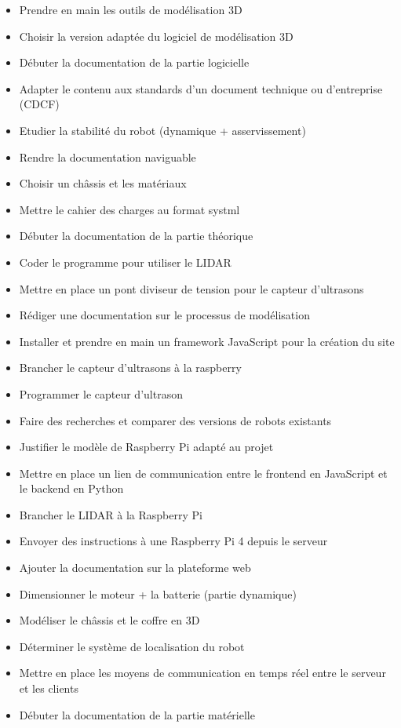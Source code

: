 \documentclass[a4paper,12pt]{report}  %
\begin{document}
\begin{itemize}
	\item Prendre en main les outils de modélisation 3D
	\item Choisir la version adaptée du logiciel de modélisation 3D
	\item Débuter la documentation de la partie logicielle
	\item Adapter le contenu aux standards d’un document technique ou d’entreprise (CDCF)
	\item Etudier la stabilité du robot (dynamique + asservissement)
	\item Rendre la documentation naviguable
	\item Choisir un châssis et les matériaux
	\item Mettre le cahier des charges au format systml
	\item Débuter la documentation de la partie théorique
	\item Coder le programme pour utiliser le LIDAR
	\item Mettre en place un pont diviseur de tension pour le capteur d'ultrasons
	\item Rédiger une documentation sur le processus de modélisation 
	\item Installer et prendre en main un framework JavaScript pour la création du site 
	\item Brancher le capteur d'ultrasons à la raspberry
	\item Programmer le capteur d'ultrason
	\item Faire des recherches et comparer des versions de robots existants
	\item Justifier le modèle de Raspberry Pi adapté au projet
	\item Mettre en place un lien de communication entre le frontend en JavaScript et le backend en Python
	\item Brancher le LIDAR à la Raspberry Pi
	\item Envoyer des instructions à une Raspberry Pi 4 depuis le serveur
	\item Ajouter la documentation sur la plateforme web
	\item Dimensionner le moteur + la batterie (partie dynamique)
	\item Modéliser le châssis et le coffre en 3D
	\item Déterminer le système de localisation du robot
	\item Mettre en place les moyens de communication en temps réel entre le serveur et les clients
	\item Débuter la documentation de la partie matérielle

\end{itemize}
\end{document}
